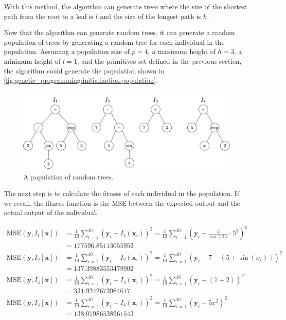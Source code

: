   With this method, the algorithm can generate trees where the size of the 
  shortest path from the root to a leaf is \(l\) and the size of the longest
  path is \(h\).

  Now that the algorithm can generate random trees, it can generate a random
  population of trees by generating a random tree for each individual in the
  population.
  Assuming a population size of \(p = 4\), a maximum height of \(h = 3\), a
  minimum height of \(l = 1\), and the primitives set defined in the previous
  section, the algorithm could generate the population shown in
  \vref{fig:genetic_programming:initialization:population}.

  \begin{figure}[ht!]
    \centering
    \includegraphics[width=\textwidth]{img/theoretical_framework/GP Initial Population.png}
    \caption{A population of random trees.}
    \label{fig:genetic_programming:initialization:population}
  \end{figure}

  The next step is to calculate the fitness of each individual in the
  population.
  If we recall, the fitness function is the MSE between the expected output and
  the actual output of the individual.

  \begin{align*}
    \mathrm{MSE}(\mathbf{y}, I_1[\mathbf{x}])
      & = \frac{1}{10} \sum_{i=1}^{10} (\mathbf{y}_i - I_1(\mathbf{x}_i))^2
        = \frac{1}{10} \sum_{i=1}^{10} \left(
          \mathbf{y}_i - \frac{3}{\sin(2)} \cdot 5^3\right)^2 \\
      & = 177596.85113055952  \\
    \mathrm{MSE}(\mathbf{y}, I_2[\mathbf{x}])
      & = \frac{1}{10} \sum_{i=1}^{10} (\mathbf{y}_i - I_2(\mathbf{x}_i))^2
        = \frac{1}{10} \sum_{i=1}^{10} \left(
          \mathbf{y}_i - 7 - (5 + \sin(x_i))\right)^2 \\
      & = 137.39883553479902  \\
    \mathrm{MSE}(\mathbf{y}, I_3[\mathbf{x}])
      & = \frac{1}{10} \sum_{i=1}^{10} (\mathbf{y}_i - I_3(\mathbf{x}_i))^2
        = \frac{1}{10} \sum_{i=1}^{10} \left(
          \mathbf{y}_i - (7 + 2)\right)^2 \\
      & = 331.9242673984617 \\
    \mathrm{MSE}(\mathbf{y}, I_4[\mathbf{x}])
      & = \frac{1}{10} \sum_{i=1}^{10} (\mathbf{y}_i - I_4(\mathbf{x}_i))^2
        = \frac{1}{10} \sum_{i=1}^{10} \left(
          \mathbf{y}_i - 5x^2\right)^2 \\
      & = 138.07986538961543
  \end{align*}

